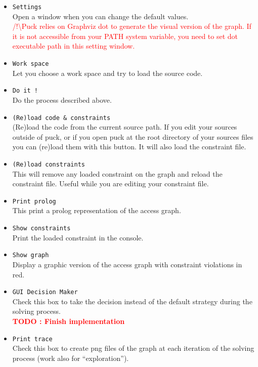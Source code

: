 \documentclass[]{article}
\newcommand{\todo}[1]{\textcolor{red}{\textbf{TODO : #1}}}
\newcommand{\important}[1]{\textcolor{red}{/!\textbackslash #1}}
\begin{document}
\begin{itemize}
	\item \verb|Settings|\\
	Open a window when you can change the default values.\\
	\important{Puck relies on Graphviz dot\cite{graphviz} to generate the visual version of the graph. If it is not accessible from your PATH system variable, you need to set dot executable path in this setting window.}
	
	\item \verb|Work space|\\
	Let you choose a work space and try to load the source code.
	
	\item \verb|Do it !|\\
	Do the process described above.
	
	\item \verb|(Re)load code & constraints|\\
	(Re)load the code from the current source path. If you edit your sources outside of puck, or if you open puck at the root directory of your sources files you can (re)load them with this button. It will also load the constraint file.
	
	\item \verb|(Re)load constraints|\\
	This will remove any loaded constraint on the graph and reload the constraint file. Useful while you are editing your constraint file.
	
	\item \verb|Print prolog|\\
	This print a prolog representation of the access graph.
	
	\item \verb|Show constraints|\\
	Print the loaded constraint in the console.
	
	\item \verb|Show graph|\\
	Display a graphic version of the access graph with constraint violations in red.
	
	\item \verb|GUI Decision Maker|\\
	Check this box to take the decision instead of the default strategy during the solving process.\\
	\todo{Finish implementation}
	
	\item \verb|Print trace|\\
	Check this box to create png files of the graph at each iteration of the solving process (work also for ``exploration'').
	

\end{itemize}
\end{document}
